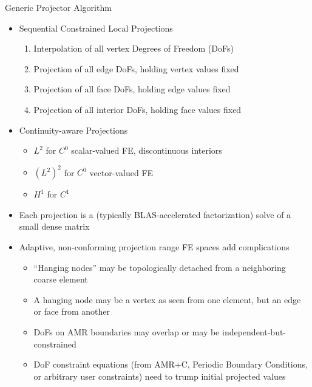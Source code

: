 \begin{frame}{Generic Projector Algorithm}
\begin{itemize}
  \item Sequential Constrained Local Projections
  \begin{enumerate}
    \item Interpolation of all vertex Degrees of Freedom (DoFs)
    \item Projection of all edge DoFs, holding vertex values fixed
    \item Projection of all face DoFs, holding edge values fixed
    \item Projection of all interior DoFs, holding face values fixed
  \end{enumerate}
  \item Continuity-aware Projections
  \begin{itemize}
    \item $L^2$ for $C^0$ scalar-valued FE, discontinuous interiors
    \item $(L^2)^2$ for $C^0$ vector-valued FE
    \item $H^1$ for $C^1$
  \end{itemize}
  \item Each projection is a (typically BLAS-accelerated
    factorization) solve of a small dense matrix
  \item Adaptive, non-conforming projection range FE spaces add complications
  \begin{itemize}
    \item ``Hanging nodes'' may be topologically detached from a
      neighboring coarse element
    \item A hanging node may be a vertex as seen from one element, but
      an edge or face from another
    \item DoFs on AMR boundaries may overlap or may be
      independent-but-constrained
    \item DoF constraint equations (from AMR+C, Periodic Boundary
      Conditions, or arbitrary user constraints) need to trump initial
      projected values
  \end{itemize}
\end{itemize}
\end{frame}
